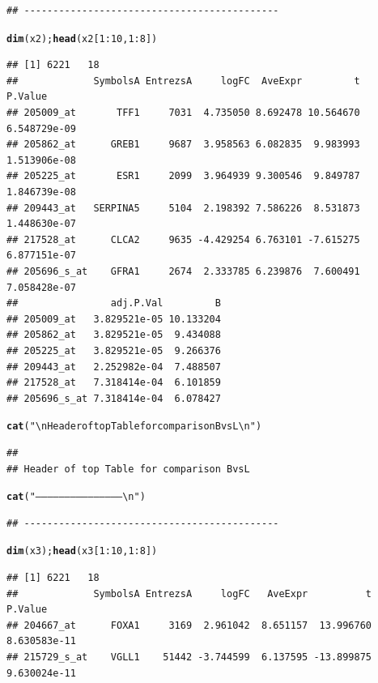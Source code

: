 \documentclass{article}\usepackage[]{graphicx}\usepackage[]{color}
\makeatletter
\newcommand{\hlnum}[1]{\textcolor[rgb]{0.686,0.059,0.569}{#1}}%
\newcommand{\hlstr}[1]{\textcolor[rgb]{0.192,0.494,0.8}{#1}}%
\newcommand{\hlopt}[1]{\textcolor[rgb]{0,0,0}{#1}}%
\newcommand{\hlstd}[1]{\textcolor[rgb]{0.345,0.345,0.345}{#1}}%
\newcommand{\hlkwd}[1]{\textcolor[rgb]{0.737,0.353,0.396}{\textbf{#1}}}%
\newenvironment{kframe}{%
 \def\at@end@of@kframe{}%
 \ifinner\ifhmode%
  \def\at@end@of@kframe{\end{minipage}}%
  \begin{minipage}{\columnwidth}%
 \fi\fi%
 \def\FrameCommand##1{\hskip\@totalleftmargin \hskip-\fboxsep
 \colorbox{shadecolor}{##1}\hskip-\fboxsep
     \hskip-\linewidth \hskip-\@totalleftmargin \hskip\columnwidth}%
 \MakeFramed {\advance\hsize-\width
   \@totalleftmargin\z@ \linewidth\hsize
   \@setminipage}}%
 {\par\unskip\endMakeFramed%
 \at@end@of@kframe}
\newenvironment{knitrout}{}{} %
\makeatother
\begin{document}
\begin{knitrout}
\begin{kframe}
\begin{alltt}
\end{alltt}
\begin{verbatim}
## --------------------------------------------
\end{verbatim}
\begin{alltt}
\hlkwd{dim}\hlstd{(x2);} \hlkwd{head}\hlstd{(x2[}\hlnum{1}\hlopt{:}\hlnum{10}\hlstd{,} \hlnum{1}\hlopt{:}\hlnum{8}\hlstd{])}
\end{alltt}
\begin{verbatim}
## [1] 6221   18
##             SymbolsA EntrezsA     logFC  AveExpr         t      P.Value
## 205009_at       TFF1     7031  4.735050 8.692478 10.564670 6.548729e-09
## 205862_at      GREB1     9687  3.958563 6.082835  9.983993 1.513906e-08
## 205225_at       ESR1     2099  3.964939 9.300546  9.849787 1.846739e-08
## 209443_at   SERPINA5     5104  2.198392 7.586226  8.531873 1.448630e-07
## 217528_at      CLCA2     9635 -4.429254 6.763101 -7.615275 6.877151e-07
## 205696_s_at    GFRA1     2674  2.333785 6.239876  7.600491 7.058428e-07
##                adj.P.Val         B
## 205009_at   3.829521e-05 10.133204
## 205862_at   3.829521e-05  9.434088
## 205225_at   3.829521e-05  9.266376
## 209443_at   2.252982e-04  7.488507
## 217528_at   7.318414e-04  6.101859
## 205696_s_at 7.318414e-04  6.078427
\end{verbatim}
\begin{alltt}
\hlkwd{cat}\hlstd{(}\hlstr{"\textbackslash{}nHeader of top Table for comparison BvsL\textbackslash{}n"}\hlstd{)}
\end{alltt}
\begin{verbatim}
## 
## Header of top Table for comparison BvsL
\end{verbatim}
\begin{alltt}
\hlkwd{cat}\hlstd{(}\hlstr{"--------------------------------------------\textbackslash{}n"}\hlstd{)}
\end{alltt}
\begin{verbatim}
## --------------------------------------------
\end{verbatim}
\begin{alltt}
\hlkwd{dim}\hlstd{(x3);} \hlkwd{head}\hlstd{(x3[}\hlnum{1}\hlopt{:}\hlnum{10}\hlstd{,} \hlnum{1}\hlopt{:}\hlnum{8}\hlstd{])}
\end{alltt}
\begin{verbatim}
## [1] 6221   18
##             SymbolsA EntrezsA     logFC   AveExpr          t      P.Value
## 204667_at      FOXA1     3169  2.961042  8.651157  13.996760 8.630583e-11
## 215729_s_at    VGLL1    51442 -3.744599  6.137595 -13.899875 9.630024e-11

\end{verbatim}
\end{kframe}
\end{knitrout}
\end{document}
